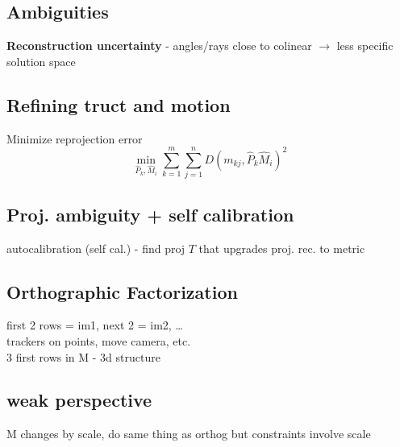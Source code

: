 \documentclass{article}
\begin{document}
\subsection{Ambiguities}
\textbf{Reconstruction uncertainty} - angles/rays close to colinear $\to$ less
specific solution space



\subsection{Refining truct and motion}
Minimize reprojection error
\[
    \min_{\hat P _k, \hat M_i} \sum_{k=1}^{m}\sum_{j=1}^{n}
    D (m_{kj}, \hat P_k \hat M_i)^2
\]

\subsection{Proj. ambiguity + self calibration}
autocalibration (self cal.) - find proj $T$ that upgrades proj. rec. to metric 



\subsection{Orthographic Factorization}
first 2 rows = im1, next 2 = im2, \dots
\\
trackers on points, move camera, etc.
\\
3 first rows in M - 3d structure

\subsection{weak perspective}
M changes by scale, do same thing as orthog but constraints involve scale 
\end{document}
